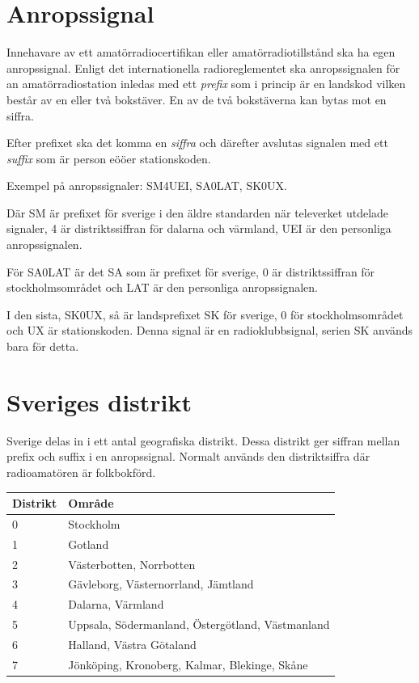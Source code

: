 \section{Anropssignal}

Innehavare av ett amatörradiocertifikan eller amatörradiotillstånd ska
ha egen anropssignal. Enligt det internationella radioreglementet ska
anropssignalen för an amatörradiostation inledas med ett \emph{prefix}
som i princip är en landskod vilken består av en eller två bokstäver.
En av de två bokstäverna kan bytas mot en siffra.

Efter prefixet ska det komma en \emph{siffra} och därefter avslutas
signalen med ett \emph{suffix} som är person eööer stationskoden.

Exempel på anropssignaler: SM4UEI, SA0LAT, SK0UX.

Där SM är prefixet för sverige i den äldre standarden när televerket
utdelade signaler, 4 är distriktssiffran för dalarna och värmland, UEI
är den personliga anropssignalen.

För SA0LAT är det SA som är prefixet för sverige, 0 är
distriktssiffran för stockholmsområdet och LAT är den personliga
anropssignalen.

I den sista, SK0UX, så är landsprefixet SK för sverige, 0 för
stockholmsområdet och UX är stationskoden. Denna signal är en
radioklubbsignal, serien SK används bara för detta.

\section{Sveriges distrikt}

Sverige delas in i ett antal geografiska distrikt. Dessa distrikt ger
siffran mellan prefix och suffix i en anropssignal. Normalt används
den distriktsiffra där radioamatören är folkbokförd.

\begin{tabularx}{\columnwidth}{lX}
  \textbf{Distrikt} & \textbf{Område}\\ \hline
  0 & Stockholm\\
  1 & Gotland\\
  2 & Västerbotten, Norrbotten\\
  3 & Gävleborg, Västernorrland, Jämtland\\
  4 & Dalarna, Värmland\\
  5 & Uppsala, Södermanland, Östergötland, Västmanland\\
  6 & Halland, Västra Götaland\\
  7 & Jönköping, Kronoberg, Kalmar, Blekinge, Skåne\\
\end{tabularx}

